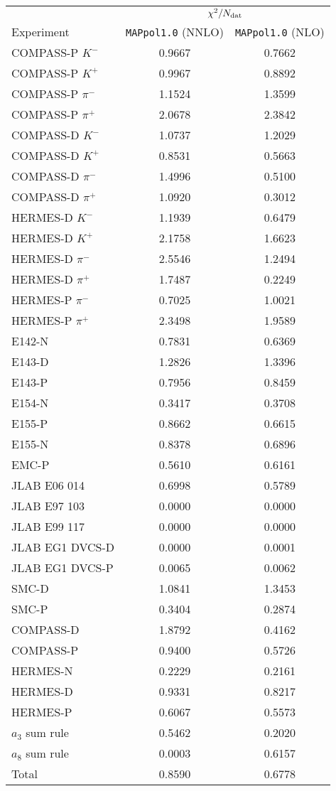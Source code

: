 \begin{tabular}{l@{\hspace{1cm}}c@{\hspace{1cm}}c}
  \toprule \midrule
  \addlinespace
                        & \multicolumn{2}{c}{$\chi^2/N_{\textrm{dat}}$} \\
  \cmidrule(lr){2-3}
      Experiment        &   \texttt{MAPpol1.0} (NNLO)    &    \texttt{MAPpol1.0} (NLO)    \tabularnewline
  \midrule
  \addlinespace
      COMPASS-P $K^-$   &   0.9667    &    0.7662   \tabularnewline
      COMPASS-P $K^+$   &   0.9967    &    0.8892   \tabularnewline
    COMPASS-P $\pi^-$   &   1.1524    &    1.3599   \tabularnewline
    COMPASS-P $\pi^+$   &   2.0678    &    2.3842   \tabularnewline
      COMPASS-D $K^-$   &   1.0737    &    1.2029   \tabularnewline
      COMPASS-D $K^+$   &   0.8531    &    0.5663   \tabularnewline
    COMPASS-D $\pi^-$   &   1.4996    &    0.5100   \tabularnewline
    COMPASS-D $\pi^+$   &   1.0920    &    0.3012   \tabularnewline
      HERMES-D  $K^-$   &   1.1939    &    0.6479   \tabularnewline
      HERMES-D  $K^+$   &   2.1758    &    1.6623   \tabularnewline
    HERMES-D  $\pi^-$   &   2.5546    &    1.2494   \tabularnewline
    HERMES-D  $\pi^+$   &   1.7487    &    0.2249   \tabularnewline
    HERMES-P  $\pi^-$   &   0.7025    &    1.0021   \tabularnewline
    HERMES-P  $\pi^+$   &   2.3498    &    1.9589   \tabularnewline
               E142-N   &   0.7831    &    0.6369   \tabularnewline
               E143-D   &   1.2826    &    1.3396   \tabularnewline
               E143-P   &   0.7956    &    0.8459   \tabularnewline
               E154-N   &   0.3417    &    0.3708   \tabularnewline
               E155-P   &   0.8662    &    0.6615   \tabularnewline
               E155-N   &   0.8378    &    0.6896   \tabularnewline
                EMC-P   &   0.5610    &    0.6161   \tabularnewline
         JLAB E06 014   &   0.6998    &    0.5789   \tabularnewline
         JLAB E97 103   &   0.0000    &    0.0000   \tabularnewline
         JLAB E99 117   &   0.0000    &    0.0000   \tabularnewline
      JLAB EG1 DVCS-D   &   0.0000    &    0.0001   \tabularnewline
      JLAB EG1 DVCS-P   &   0.0065    &    0.0062   \tabularnewline
                SMC-D   &   1.0841    &    1.3453   \tabularnewline
                SMC-P   &   0.3404    &    0.2874   \tabularnewline
            COMPASS-D   &   1.8792    &    0.4162   \tabularnewline    
            COMPASS-P   &   0.9400    &    0.5726   \tabularnewline
             HERMES-N   &   0.2229    &    0.2161   \tabularnewline
             HERMES-D   &   0.9331    &    0.8217   \tabularnewline
             HERMES-P   &   0.6067    &    0.5573   \tabularnewline
       $a_3$ sum rule   &   0.5462    &    0.2020   \tabularnewline
       $a_8$ sum rule   &   0.0003    &    0.6157   \tabularnewline
  \midrule
  \addlinespace
                Total   &   0.8590    &    0.6778   \tabularnewline
  \midrule \bottomrule
\end{tabular}